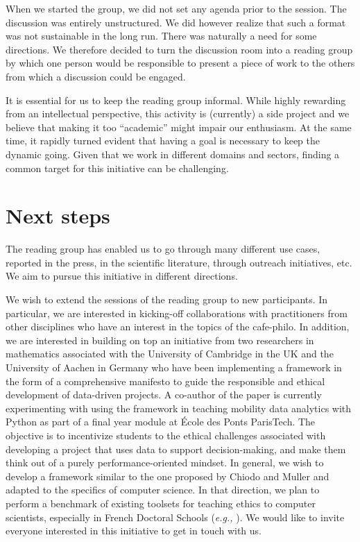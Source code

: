 \documentclass[journal]{IEEEtran}
\begin{document}
When we  started the  group, we did  not set any  agenda prior  to the
session.  The discussion  was  entirely unstructured.  We did  however
realize that such a format was  not sustainable in the long run. There
was naturally a need for some directions. We therefore decided to turn
the discussion room into a reading  group by which one person would be
responsible to  present a  piece of  work to the  others from  which a
discussion could be engaged.

It  is essential  for us  to keep  the reading  group informal.  While
highly rewarding  from an  intellectual perspective, this  activity is
(currently)  a  side  project  and  we  believe  that  making  it  too
“academic” might impair  our enthusiasm. At the same  time, it rapidly
turned evident  that having a  goal is  necessary to keep  the dynamic
going. Given that we work in  different domains and sectors, finding a
common target for this initiative can be challenging.

\section{Next steps}

The reading  group has  enabled us  to go  through many  different use
cases, reported  in the press,  in the scientific  literature, through
outreach  initiatives,  etc.  We  aim to  pursue  this  initiative  in
different directions.

We  wish  to  extend  the  sessions   of  the  reading  group  to  new
participants.  In   particular,  we  are  interested   in  kicking-off
collaborations with  practitioners from other disciplines  who have an
interest  in  the  topics  of  the cafe-philo.  In  addition,  we  are
interested in  building on top  an initiative from two  researchers in
mathematics associated with the University  of Cambridge in the UK and
the  University of  Aachen in  Germany  who have  been implementing  a
framework in the form of  a comprehensive manifesto \cite{chiodo23} to
guide  the   responsible  and   ethical  development   of  data-driven
projects. A  co-author of  the paper  is currently  experimenting with
using the framework in teaching mobility data analytics with Python as
part  of  a final  year  module  at  École  des Ponts  ParisTech.  The
objective  is  to  incentivize  students  to  the  ethical  challenges
associated  with  developing  a  project that  uses  data  to  support
decision-making,   and    make   them   think   out    of   a   purely
performance-oriented  mindset.  In  general,  we  wish  to  develop  a
framework similar to the one proposed by Chiodo and Muller and adapted
to the  specifics of computer science.  In that direction, we  plan to
perform  a  benchmark of  existing  toolsets  for teaching  ethics  to
computer   scientists,   especially   in   French   Doctoral   Schools
(\textit{e.g.,} \cite{moocEthics}).  We would like to  invite everyone
interested in this initiative to get in touch with us.
\end{document}
